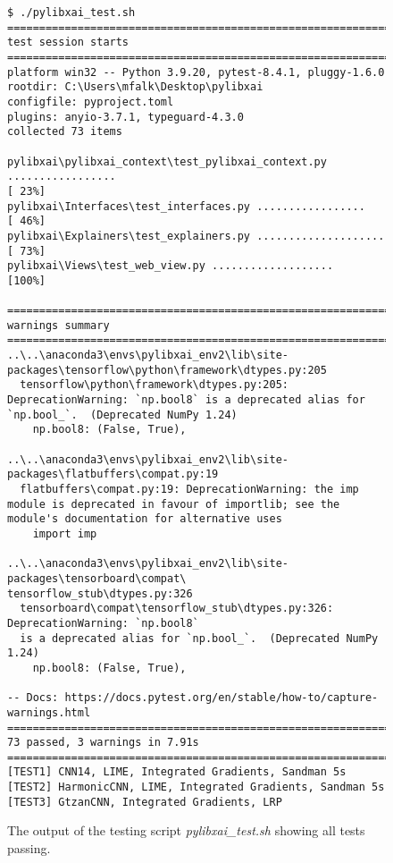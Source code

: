 \documentclass[
    bindingoffset=5mm,  %
    footnoteindent=3mm, %
    hyphenation=true    %
]{src/wut-thesis}
\begin{document}
\begin{figure}%
\begin{verbatim}
$ ./pylibxai_test.sh
======================================================================== test session starts =========================================================================
platform win32 -- Python 3.9.20, pytest-8.4.1, pluggy-1.6.0
rootdir: C:\Users\mfalk\Desktop\pylibxai
configfile: pyproject.toml
plugins: anyio-3.7.1, typeguard-4.3.0
collected 73 items

pylibxai\pylibxai_context\test_pylibxai_context.py .................                                                                                            [ 23%]
pylibxai\Interfaces\test_interfaces.py .................                                                                                                        [ 46%]
pylibxai\Explainers\test_explainers.py ....................                                                                                                     [ 73%]
pylibxai\Views\test_web_view.py ...................                                                                                                             [100%]

========================================================================== warnings summary ==========================================================================
..\..\anaconda3\envs\pylibxai_env2\lib\site-packages\tensorflow\python\framework\dtypes.py:205
  tensorflow\python\framework\dtypes.py:205: DeprecationWarning: `np.bool8` is a deprecated alias for `np.bool_`.  (Deprecated NumPy 1.24)
    np.bool8: (False, True),

..\..\anaconda3\envs\pylibxai_env2\lib\site-packages\flatbuffers\compat.py:19
  flatbuffers\compat.py:19: DeprecationWarning: the imp module is deprecated in favour of importlib; see the module's documentation for alternative uses
    import imp

..\..\anaconda3\envs\pylibxai_env2\lib\site-packages\tensorboard\compat\
tensorflow_stub\dtypes.py:326
  tensorboard\compat\tensorflow_stub\dtypes.py:326: DeprecationWarning: `np.bool8`
  is a deprecated alias for `np.bool_`.  (Deprecated NumPy 1.24)
    np.bool8: (False, True),

-- Docs: https://docs.pytest.org/en/stable/how-to/capture-warnings.html
=================================================================== 73 passed, 3 warnings in 7.91s ===================================================================
[TEST1] CNN14, LIME, Integrated Gradients, Sandman 5s
[TEST2] HarmonicCNN, LIME, Integrated Gradients, Sandman 5s
[TEST3] GtzanCNN, Integrated Gradients, LRP
\end{verbatim}
\caption{The output of the testing script \emph{pylibxai\_test.sh} showing all tests passing.}
\label{fig:TestingScriptOutput}
\end{figure}
\end{document}
